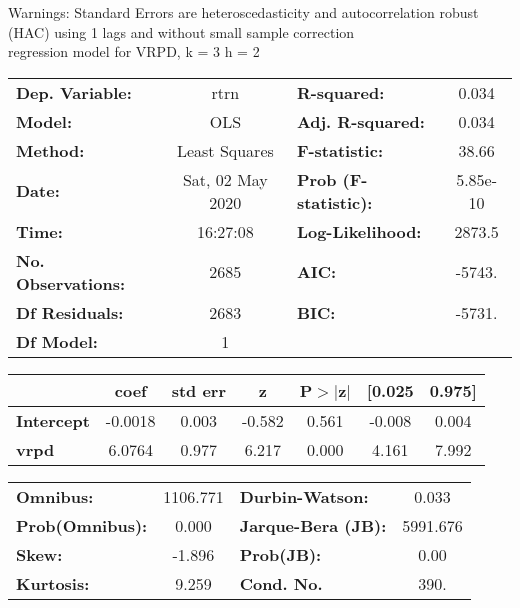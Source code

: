 Warnings: \newline
 [1] Standard Errors are heteroscedasticity and autocorrelation robust (HAC) using 1 lags and without small sample correction\\ 

regression model for VRPD, k = 3 h = 2\begin{center}
\begin{tabular}{lclc}
\toprule
\textbf{Dep. Variable:}    &       rtrn       & \textbf{  R-squared:         } &     0.034   \\
\textbf{Model:}            &       OLS        & \textbf{  Adj. R-squared:    } &     0.034   \\
\textbf{Method:}           &  Least Squares   & \textbf{  F-statistic:       } &     38.66   \\
\textbf{Date:}             & Sat, 02 May 2020 & \textbf{  Prob (F-statistic):} &  5.85e-10   \\
\textbf{Time:}             &     16:27:08     & \textbf{  Log-Likelihood:    } &    2873.5   \\
\textbf{No. Observations:} &        2685      & \textbf{  AIC:               } &    -5743.   \\
\textbf{Df Residuals:}     &        2683      & \textbf{  BIC:               } &    -5731.   \\
\textbf{Df Model:}         &           1      & \textbf{                     } &             \\
\bottomrule
\end{tabular}
\begin{tabular}{lcccccc}
                   & \textbf{coef} & \textbf{std err} & \textbf{z} & \textbf{P$> |$z$|$} & \textbf{[0.025} & \textbf{0.975]}  \\
\midrule
\textbf{Intercept} &      -0.0018  &        0.003     &    -0.582  &         0.561        &       -0.008    &        0.004     \\
\textbf{vrpd}      &       6.0764  &        0.977     &     6.217  &         0.000        &        4.161    &        7.992     \\
\bottomrule
\end{tabular}
\begin{tabular}{lclc}
\textbf{Omnibus:}       & 1106.771 & \textbf{  Durbin-Watson:     } &    0.033  \\
\textbf{Prob(Omnibus):} &   0.000  & \textbf{  Jarque-Bera (JB):  } & 5991.676  \\
\textbf{Skew:}          &  -1.896  & \textbf{  Prob(JB):          } &     0.00  \\
\textbf{Kurtosis:}      &   9.259  & \textbf{  Cond. No.          } &     390.  \\
\bottomrule
\end{tabular}
\end{center}

